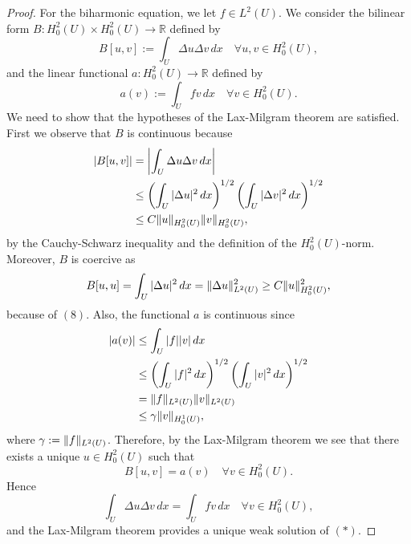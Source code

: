 \documentclass{article}
\DeclarePairedDelimiter{\norm}{\lVert}{\rVert}
\begin{document}
\begin{flushleft}
\begin{proof}
For the biharmonic equation, we let $f\in L^2(U)$. We consider the bilinear form $B:H_0^2(U)\times H_0^2(U) \to \mathbb R$ defined by
$$B[u,v]:=\int_U \Delta u \Delta v \,dx \quad \forall u,v\in H_0^2(U),$$
and the linear functional $a:H_0^2(U)\to\mathbb R$ defined by
$$a(v):=\int_U fv\,dx \quad \forall v\in H_0^2(U).$$
We need to show that the hypotheses of the Lax-Milgram theorem are satisfied. First we observe that $B$ is continuous because
\begin{align*}
    |B[u,v]|&= \left|\int_U \Delta u \Delta v\,dx\right| \\&\le
    \left(\int_U |\Delta u|^2\,dx\right)^{1/2} \left(\int_U |\Delta v|^2\,dx\right)^{1/2}\\&\le
    C\norm{u}_{H_0^2(U)}\norm{v}_{H_0^2(U)},
\end{align*}
by the Cauchy-Schwarz inequality and the definition of the $H_0^2(U)$-norm. Moreover, $B$ is coercive as
$$B[u,u]=\int_U |\Delta u|^2\,dx = \norm{\Delta u}_{L^2(U)}^2\ge C\norm{u}_{H_0^2(U)}^2,$$
because of $(8)$. Also, the functional $a$ is continuous since
\begin{align*}
|a(v)| &\le \int_U |f||v|\,dx \\&\le 
\left(\int_U |f|^2\,dx\right)^{1/2}\left(\int_U |v|^2\,dx\right)^{1/2}\\&=
\norm{f}_{L^2(U)}\norm{v}_{L^2(U)} \\&\le
\gamma\norm{v}_{H_0^1(U)},
\end{align*}
where $\gamma := \norm{f}_{L^2(U)}$. Therefore, by the Lax-Milgram theorem we see that there exists a unique $u\in H_0^2(U)$ such that 
$$B[u,v]=a(v)\quad \forall v \in H_0^2(U).$$
Hence
$$\int_U \Delta u \Delta v \,dx = \int_U fv\,dx \quad \forall v\in H_0^2(U),$$
and the Lax-Milgram theorem provides a unique weak solution of $(\ast)$.

\end{proof}


\end{flushleft}
\end{document}

